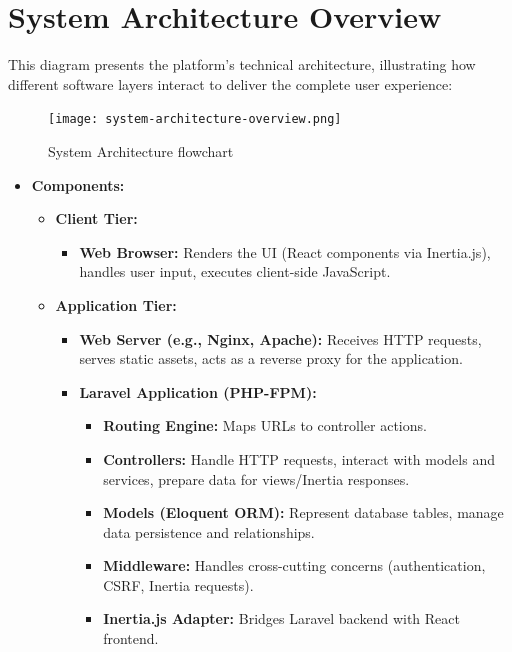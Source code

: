 \documentclass[12pt,a4paper]{article}
\begin{document}
\section{System Architecture Overview}
This diagram presents the platform's technical architecture, illustrating how different software layers interact to deliver the complete user experience:
\begin{figure}[H] %
    \centering       
    \texttt{[image: system-architecture-overview.png]}
    \caption{System Architecture flowchart}
    \label{fig:system-architecture-overview}
\end{figure}
\FloatBarrier %

\begin{itemize}
    \item \textbf{Components:}
    \begin{itemize}
        \item \textbf{Client Tier:}
        \begin{itemize}
            \item \textbf{Web Browser:} Renders the UI (React components via Inertia.js), handles user input, executes client-side JavaScript.
        \end{itemize}
        \item \textbf{Application Tier:}
        \begin{itemize}
            \item \textbf{Web Server (e.g., Nginx, Apache):} Receives HTTP requests, serves static assets, acts as a reverse proxy for the application.
            \item \textbf{Laravel Application (PHP-FPM):}
            \begin{itemize}
                \item \textbf{Routing Engine:} Maps URLs to controller actions.
                \item \textbf{Controllers:} Handle HTTP requests, interact with models and services, prepare data for views/Inertia responses.
                \item \textbf{Models (Eloquent ORM):} Represent database tables, manage data persistence and relationships.
                \item \textbf{Middleware:} Handles cross-cutting concerns (authentication, CSRF, Inertia requests).
                \item \textbf{Inertia.js Adapter:} Bridges Laravel backend with React frontend.

\end{itemize}
\end{itemize}
\end{itemize}
\end{itemize}
\end{document}
